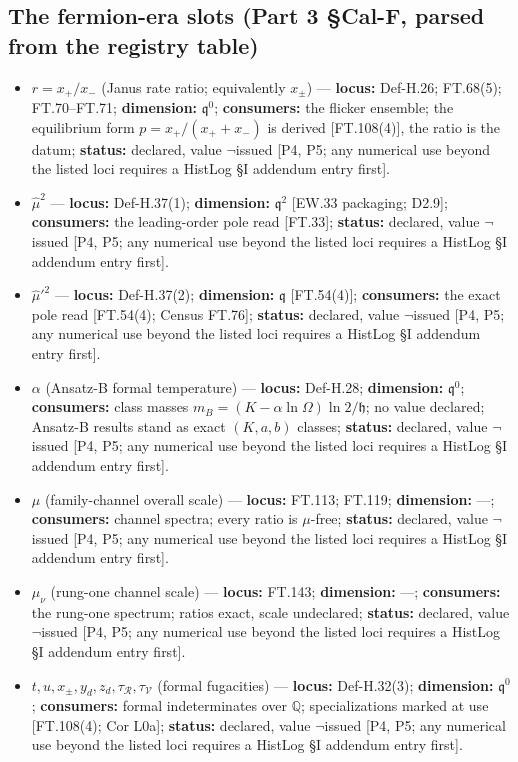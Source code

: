 \documentclass[11pt,openany]{report}
\theoremstyle{canonplain}
\theoremstyle{canondef}
\begin{document}
\subsection*{The fermion-era slots (Part 3 §Cal-F, parsed from the registry table)}
\begin{itemize}\setlength{\itemsep}{2pt}
\item $r=x_+/x_-$ (Janus rate ratio; equivalently $x_\pm$) — \textbf{locus:} Def-H.26; FT.68(5); FT.70–FT.71; \textbf{dimension:} $\mathfrak q^0$; \textbf{consumers:} the flicker ensemble; the equilibrium form $p=x_+/(x_++x_-)$ is derived [FT.108(4)], the ratio is the datum; \textbf{status:} declared, value $\neg$issued [P4, P5; any numerical use beyond the listed loci requires a HistLog §I addendum entry first].
\item $\hat\mu^2$ — \textbf{locus:} Def-H.37(1); \textbf{dimension:} $\mathfrak q^2$ [EW.33 packaging; D2.9]; \textbf{consumers:} the leading-order pole read [FT.33]; \textbf{status:} declared, value $\neg$issued [P4, P5; any numerical use beyond the listed loci requires a HistLog §I addendum entry first].
\item $\hat\mu'^2$ — \textbf{locus:} Def-H.37(2); \textbf{dimension:} $\mathfrak q$ [FT.54(4)]; \textbf{consumers:} the exact pole read [FT.54(4); Census FT.76]; \textbf{status:} declared, value $\neg$issued [P4, P5; any numerical use beyond the listed loci requires a HistLog §I addendum entry first].
\item $\alpha$ (Ansatz-B formal temperature) — \textbf{locus:} Def-H.28; \textbf{dimension:} $\mathfrak q^0$; \textbf{consumers:} class masses $m_B=(K-\alpha\ln\Omega)\ln2/\mathfrak h$; no value declared; Ansatz-B results stand as exact $(K,a,b)$ classes; \textbf{status:} declared, value $\neg$issued [P4, P5; any numerical use beyond the listed loci requires a HistLog §I addendum entry first].
\item $\mu$ (family-channel overall scale) — \textbf{locus:} FT.113; FT.119; \textbf{dimension:} —; \textbf{consumers:} channel spectra; every ratio is $\mu$-free; \textbf{status:} declared, value $\neg$issued [P4, P5; any numerical use beyond the listed loci requires a HistLog §I addendum entry first].
\item $\mu_\nu$ (rung-one channel scale) — \textbf{locus:} FT.143; \textbf{dimension:} —; \textbf{consumers:} the rung-one spectrum; ratios exact, scale undeclared; \textbf{status:} declared, value $\neg$issued [P4, P5; any numerical use beyond the listed loci requires a HistLog §I addendum entry first].
\item $t,u,x_\pm,y_d,z_d,\tau_{\mathcal R},\tau_{\mathcal V}$ (formal fugacities) — \textbf{locus:} Def-H.32(3); \textbf{dimension:} $\mathfrak q^0$; \textbf{consumers:} formal indeterminates over $\mathbb Q$; specializations marked at use [FT.108(4); Cor L0a]; \textbf{status:} declared, value $\neg$issued [P4, P5; any numerical use beyond the listed loci requires a HistLog §I addendum entry first].
\end{itemize}
\end{document}
